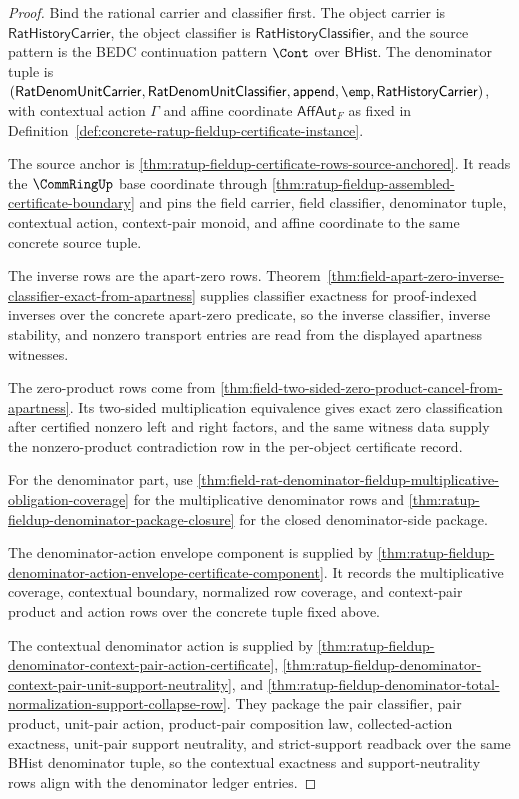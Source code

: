 \begin{proof}
Bind the rational carrier and classifier first. The object carrier is
$\mathsf{RatHistoryCarrier}$, the object classifier is
$\mathsf{RatHistoryClassifier}$, and the source pattern is the BEDC
continuation pattern $\Cont$ over $\mathsf{BHist}$. The denominator tuple is
$(\mathsf{RatDenomUnitCarrier},\mathsf{RatDenomUnitClassifier},
\mathsf{append},\emp,\mathsf{RatHistoryCarrier})$, with contextual action
$\Gamma$ and affine coordinate $\mathsf{AffAut}_F$ as fixed in
Definition~\ref{def:concrete-ratup-fieldup-certificate-instance}.

The source anchor is
\autoref{thm:ratup-fieldup-certificate-rows-source-anchored}. It reads the
$\CommRingUp$ base coordinate through
\autoref{thm:ratup-fieldup-assembled-certificate-boundary} and pins the field
carrier, field classifier, denominator tuple, contextual action, context-pair
monoid, and affine coordinate to the same concrete source tuple.

The inverse rows are the apart-zero rows. Theorem~\ref{thm:field-apart-zero-inverse-classifier-exact-from-apartness}
supplies classifier exactness for proof-indexed inverses over the concrete
apart-zero predicate, so the inverse classifier, inverse stability, and
nonzero transport entries are read from the displayed apartness witnesses.

The zero-product rows come from
\autoref{thm:field-two-sided-zero-product-cancel-from-apartness}. Its
two-sided multiplication equivalence gives exact zero classification after
certified nonzero left and right factors, and the same witness data supply the
nonzero-product contradiction row in the per-object certificate record.

For the denominator part, use
\autoref{thm:field-rat-denominator-fieldup-multiplicative-obligation-coverage}
for the multiplicative denominator rows and
\autoref{thm:ratup-fieldup-denominator-package-closure} for the closed
denominator-side package.

The denominator-action envelope component is supplied by
\autoref{thm:ratup-fieldup-denominator-action-envelope-certificate-component}.
It records the multiplicative coverage, contextual boundary, normalized row
coverage, and context-pair product and action rows over the concrete tuple
fixed above.

The contextual denominator action is supplied by
\autoref{thm:ratup-fieldup-denominator-context-pair-action-certificate},
\autoref{thm:ratup-fieldup-denominator-context-pair-unit-support-neutrality},
and
\autoref{thm:ratup-fieldup-denominator-total-normalization-support-collapse-row}.
They package the pair classifier, pair product, unit-pair action, product-pair
composition law, collected-action exactness, unit-pair support neutrality, and
strict-support readback over the same BHist denominator tuple, so the contextual
exactness and support-neutrality rows align with the denominator ledger entries.


\end{proof}
